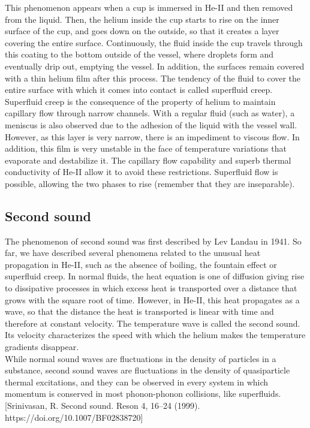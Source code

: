 \documentclass{article}
\begin{document}
This phenomenon appears when a cup is immersed in He-II and then removed from the liquid. Then, the helium inside the cup starts to rise on the inner surface of the cup, and goes down on the outside, so that it creates a layer covering the entire surface. Continuously, the fluid inside the cup travels through this coating to the bottom outside of the vessel, where droplets form and eventually drip out, emptying the vessel. In addition, the surfaces remain covered with a thin helium film after this process. The tendency of the fluid to cover the entire surface with which it comes into contact is called superfluid creep.
\\

Superfluid creep is the consequence of the property of helium to maintain capillary flow through narrow channels. With a regular fluid (such as water), a meniscus is also observed due to the adhesion of the liquid with the vessel wall. However, as this layer is very narrow, there is an impediment to viscous flow. In addition, this film is very unstable in the face of temperature variations that evaporate and destabilize it. The capillary flow capability and superb thermal conductivity of He-II allow it to avoid these restrictions. Superfluid flow is possible, allowing the two phases to rise (remember that they are inseparable).
\\

\subsection{Second sound}

The phenomenon of second sound was first described by Lev Landau in 1941. \cite{LevLan}
So far, we have described several phenomena related to the unusual heat propagation in He-II, such as the absence of boiling, the fountain effect or superfluid creep. In normal fluids, the heat equation is one of diffusion giving rise to dissipative processes in which excess heat is transported over a distance that grows with the square root of time. However, in He-II, this heat propagates as a wave, so that the distance the heat is transported is linear with time and therefore at constant velocity. The temperature wave is called the second sound. Its velocity characterizes the speed with which the helium makes the temperature gradients disappear.\\

While normal sound waves are fluctuations in the density of particles in a substance, second sound waves are fluctuations in the density of quasiparticle thermal excitations, and they can be observed in every system in which momentum is conserved in most phonon-phonon collisions, like superfluids. [Srinivasan, R. Second sound. Reson 4, 16–24 (1999). https://doi.org/10.1007/BF02838720]
\end{document}

